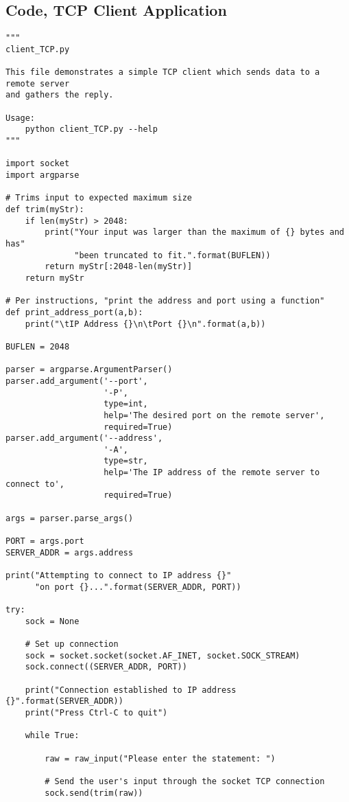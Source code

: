 \documentclass{article}
\begin{document}
\subsection*{Code, TCP Client Application}
\begin{verbatim}
"""
client_TCP.py

This file demonstrates a simple TCP client which sends data to a remote server
and gathers the reply.

Usage:
    python client_TCP.py --help
"""

import socket
import argparse

# Trims input to expected maximum size
def trim(myStr):
    if len(myStr) > 2048:
        print("Your input was larger than the maximum of {} bytes and has"
              "been truncated to fit.".format(BUFLEN))
        return myStr[:2048-len(myStr)]
    return myStr

# Per instructions, "print the address and port using a function"
def print_address_port(a,b):
    print("\tIP Address {}\n\tPort {}\n".format(a,b))

BUFLEN = 2048

parser = argparse.ArgumentParser()
parser.add_argument('--port',
                    '-P',
                    type=int,
                    help='The desired port on the remote server',
                    required=True)
parser.add_argument('--address',
                    '-A',
                    type=str,
                    help='The IP address of the remote server to connect to',
                    required=True)

args = parser.parse_args()

PORT = args.port
SERVER_ADDR = args.address

print("Attempting to connect to IP address {}"
      "on port {}...".format(SERVER_ADDR, PORT))

try:
    sock = None

    # Set up connection
    sock = socket.socket(socket.AF_INET, socket.SOCK_STREAM)
    sock.connect((SERVER_ADDR, PORT))

    print("Connection established to IP address {}".format(SERVER_ADDR))
    print("Press Ctrl-C to quit")

    while True:
        
        raw = raw_input("Please enter the statement: ")

        # Send the user's input through the socket TCP connection
        sock.send(trim(raw))


\end{verbatim}
\end{document}

